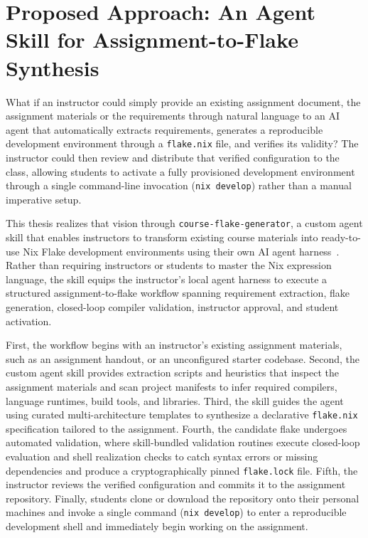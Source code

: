 \section{Proposed Approach: An Agent Skill for Assignment-to-Flake Synthesis}

What if an instructor could simply provide an existing assignment document, the
assignment materials or the requirements through natural language to an AI agent
that automatically extracts requirements, generates a reproducible development environment
through a \texttt{flake.nix} file, and verifies its validity? The instructor
could then review and distribute that verified configuration to the class, allowing
students to activate a fully provisioned development environment through a single
command-line invocation (\texttt{nix develop}) rather than a manual imperative
setup.

This thesis realizes that vision through \texttt{course-flake-generator}, a
custom agent skill that enables instructors to transform existing course
materials into ready-to-use Nix Flake development environments using their own
AI agent harness~\cite{mengAgentHarnessLarge2026,formentScaffoldingMattersMore2026,duNixRescueReproducible2026a}.
Rather than requiring instructors or students to master the Nix expression language,
the skill equips the instructor's local agent harness to execute a structured
assignment-to-flake workflow spanning requirement extraction, flake generation,
closed-loop compiler validation, instructor approval, and student activation.

First, the workflow begins with an instructor's existing assignment materials,
such as an assignment handout, or an unconfigured starter codebase. Second, the custom
agent skill provides extraction scripts and heuristics that inspect the assignment
materials and scan project manifests to infer required compilers, language
runtimes, build tools, and libraries. Third, the skill guides the agent using
curated multi-architecture templates to synthesize a declarative \texttt{flake.nix}
specification tailored to the assignment. Fourth, the candidate flake undergoes automated
validation, where skill-bundled validation routines execute closed-loop
evaluation and shell realization checks to catch syntax errors or missing
dependencies and produce a cryptographically pinned \texttt{flake.lock} file.
Fifth, the instructor reviews the verified configuration and commits it to the assignment
repository. Finally, students clone or download the repository onto their personal
machines and invoke a single command (\texttt{nix develop}) to enter a
reproducible development shell and immediately begin working on the assignment.

